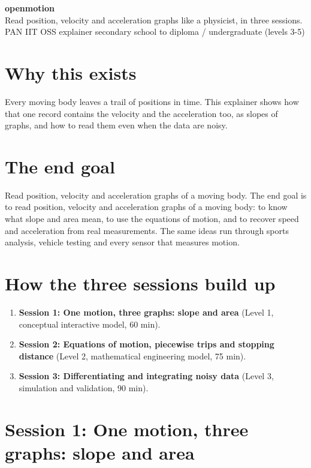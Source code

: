 \documentclass[11pt,a4paper]{article}
\begin{document}
\begin{center}{\LARGE\bfseries openmotion}\\[0.4em]{\large Read position, velocity and acceleration graphs like a physicist, in three sessions.}\\[0.2em]\small PAN IIT OSS explainer \textbullet{} secondary school to diploma / undergraduate (levels 3-5)\end{center}

\section*{Why this exists}
Every moving body leaves a trail of positions in time. This explainer shows how that one record contains the velocity and the acceleration too, as slopes of graphs, and how to read them even when the data are noisy.

\section*{The end goal}
Read position, velocity and acceleration graphs of a moving body. The end goal is to read position, velocity and acceleration graphs of a moving body: to know what slope and area mean, to use the equations of motion, and to recover speed and acceleration from real measurements. The same ideas run through sports analysis, vehicle testing and every sensor that measures motion.

\section*{How the three sessions build up}
\begin{enumerate}[nosep]
\item \textbf{Session 1: One motion, three graphs: slope and area} (Level 1, conceptual interactive model, 60 min).
\item \textbf{Session 2: Equations of motion, piecewise trips and stopping distance} (Level 2, mathematical engineering model, 75 min).
\item \textbf{Session 3: Differentiating and integrating noisy data} (Level 3, simulation and validation, 90 min).
\end{enumerate}

\section{Session 1: One motion, three graphs: slope and area}
\end{document}
